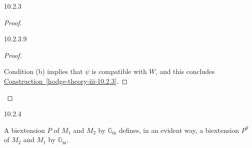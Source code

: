 \begin{construction}{10.2.3}
\begin{proof}
\begin{lemma}{10.2.3.9}
\begin{proof}
\begin{enumerate}
          \end{enumerate}\par{}Condition (b) implies that \(\psi \) is compatible with \(W\), and this concludes \hyperref[hodge-theory-iii-10.2.3]{Construction~\ref*{hodge-theory-iii-10.2.3}}.\end{proof}\end{lemma}\end{proof}\end{construction}\begin{remark}{10.2.4}\label{hodge-theory-iii-10.2.4}\skipsinglepar\par{}A biextension \(P\) of \(M_1\) and \(M_2\) by \(\mathbb {G}_\mathrm {m}\) defines, in an evident way, a biextension \(P^0\) of \(M_2\) and \(M_1\) by \(\mathbb {G}_\mathrm {m}\).
    

\end{remark}
